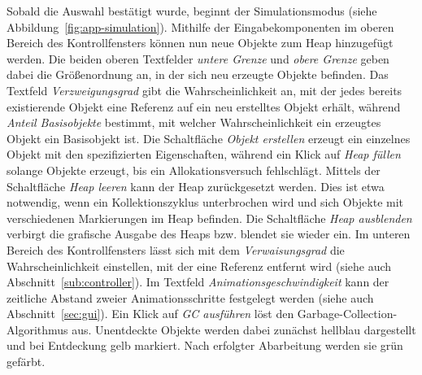 Sobald die Auswahl bestätigt wurde, beginnt der Simulationsmodus (siehe Abbildung~\ref{fig:app-simulation}).
Mithilfe der Eingabekomponenten im oberen Bereich des Kontrollfensters können nun neue Objekte zum Heap hinzugefügt werden.
Die beiden oberen Textfelder \textit{untere Grenze} und \textit{obere Grenze} geben dabei die Größenordnung an, in der sich neu erzeugte Objekte befinden.
Das Textfeld \textit{Verzweigungsgrad} gibt die Wahrscheinlichkeit an, mit der jedes bereits existierende Objekt eine Referenz auf ein neu erstelltes Objekt erhält, während \textit{Anteil Basisobjekte} bestimmt, mit welcher Wahrscheinlichkeit ein erzeugtes Objekt ein Basisobjekt ist.
Die Schaltfläche \textit{Objekt erstellen} erzeugt ein einzelnes Objekt mit den spezifizierten Eigenschaften, während ein Klick auf \textit{Heap füllen} solange Objekte erzeugt, bis ein Allokationsversuch fehlschlägt.
Mittels der Schaltfläche \textit{Heap leeren} kann der Heap zurückgesetzt werden.
Dies ist etwa notwendig, wenn ein Kollektionszyklus unterbrochen wird und sich Objekte mit verschiedenen Markierungen im Heap befinden.
Die Schaltfläche \textit{Heap ausblenden} verbirgt die grafische Ausgabe des Heaps bzw. blendet sie wieder ein.
Im unteren Bereich des Kontrollfensters lässt sich mit dem \textit{Verwaisungsgrad} die Wahrscheinlichkeit einstellen, mit der eine Referenz entfernt wird (siehe auch Abschnitt~\ref{sub:controller}).
Im Textfeld \textit{Animationsgeschwindigkeit} kann der zeitliche Abstand zweier Animationsschritte festgelegt werden (siehe auch Abschnitt~\ref{sec:gui}).
Ein Klick auf \textit{GC ausführen} löst den Garbage-Collection-Algorithmus aus.
Unentdeckte Objekte werden dabei zunächst hellblau dargestellt und bei Entdeckung gelb markiert.
Nach erfolgter Abarbeitung werden sie grün gefärbt.

